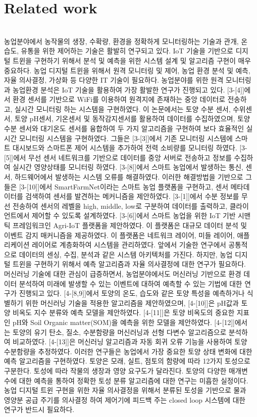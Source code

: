 \documentclass[11pt]{article}
\begin{document}
\section{Related work}
\indent \\농업분야에서 농작물의 생장, 수확량, 환경을 정확하게 모니터링하는 기술과 관개, 온습도, 유통을 위한 제어하는 기술은 활발히 연구되고 있다. IoT 기술을 기반으로 디지털 트윈을 구현하기 위해서 분석 및 예측을 위한 시스템 설계 및 알고리즘 구현이 매우 중요하다. 농업 디지털 트윈을 위해서 원격 모니터링
및 제어, 농업 환경 분석 및 예측, 자율 의사결정, 가상화 등 다양한 IT 기술이 필요하다. 농업분야를 위한 원격 모니터링 과 농업환경 분석은 IoT 기술을 활용하여 가장 활발한 연구가 진행되고 있다. [3-[4]]에서 환경 센서를 기반으로 WiFi를 이용하여 원격지에 존재하는 중앙 데이터로 전송하고, 실시간 모니터링 하는 시스템을 구현하였다. 이 논문에서는 토양 수분 센서, 수위센서, 토양 pH센서, 기온센서 및 동작감지센서를 활용하여 데이터를 수집하였으며, 토양 수분 센서와 대기온도 센서를 융합하여 두 가지 알고리즘을 구현하여 보다 효율적인 실시간 모니터링 시스템을 구현하였다. 그들은 [3-[3]]에서 기존 모니터링 시스템에 스마트
대시보드와 스마트폰 제어 시스템을 추가하여 전력 소비량를 모니터링 하였다. [3-[5]]에서 무선 센서 네트워크를 기반으로 데이터를 중앙 서버로 전송하고 정보를 수집하여 실시간 영양상태를 모니터링 하였다. [3-[8]]에서 스마트 농업에서 발생하는 통신, 센서, 하드웨어에서 발생하는 시스템 오류를 해결하였다. 이러한 해결방법을 기반으로 그들은 [3-[10]]에서 SmartFarmNet이라는 스마트 농업 플랫폼을 구현하고, 센서 메타데이터를 검색하여 센서를 발견하는 메커니즘을 제안하였다. [3-[1]]에서 수분 정보를 무선 전송하여 센서의 레벨을 high, middle, low로 구분하여 데이터를 출력하고, 클라이언트에서 제어할 수 있도록 설계하였다. [3-[6]]에서 스마트 농업을 위한 IoT 기반 시맨틱 프레임워크인 Agri-IoT 플랫폼을 제안하였다. 이 플랫폼은 대규모 데이터 분석 및 이벤트 감지 매커니즘을 제공하였다. 이 플랫폼은 네트워크 레이어, 미들 레이어, 애플리케이션 레이어로 계층화하여 시스템을 관리하였다. 앞에서 기술한 연구에서 공통적으로 데이터의 센싱, 수집, 분석과 같은 시스템 아키텍처를 가진다. 하지만, 농업 디지털 트윈을 구현하기 위해서 예측 알고리즘과 자율 의사결정에 대한 연구가 필요하다. 머신러닝 기술에 대한 관심이 급증하면서, 농업분야에서도 머신러닝 기반으로 환경 데이터 분석하여 미래에 발생할 수 있는 이벤트에 대하여 예측할 수 있는 기법에 대한 연구가 진행되고 있다. [4-[8,9]]에서 토양의 온도, 습도와 같은 토양 특성을 예측하거나 식별하기 위한 머신러닝 기술을 적용한 알고리즘을 제안하였으며, [4-[10]]은 pH값과 토양 비옥도 지수 분류와 예측 모델을 제안하였다. [4-[11]]은 토양 비옥도의 중요한 지표인 pH와 Soil Organic matter(SOM)을 예측을 위한 모델을 제안하였다. [4-[12]]에서는 토양의 유기 탄소, 질소, 수분함량을 머신러닝과 선형 다변수 알고리즘으로 분석하여 비교하였다. [4-[13]]은 머신러닝 알고리즘과 자동 회귀 오류 기능을 사용하여 토양 수분함량을 추정하였다. 이러한 연구들은 농업에서 가장 중요한 토양 상태 변화에 대한 예측 알고리즘을 구현하였다. 토양은 모래, 실트, 점토의 함량에 따라 12가지 토성으로 구분한다. 토성에 따라 작물의 생장과 영양 요구도가 달라진다. 토양의 다양한 매개변수에 대한 예측을 통하여 정확한 토성 분류 알고리즘에 대한 연구는 미흡한 실정이다. 농업 디지털 트윈 구현을 위한 자율 의사결정을 위해서 분류된 토성을 기반으로 물과 영양분 공급 주기를 의사결정 하여 제어기에 피드백 주는 closed loop 시스템에 대한 연구가 반드시 필요하다.
\end{document}
